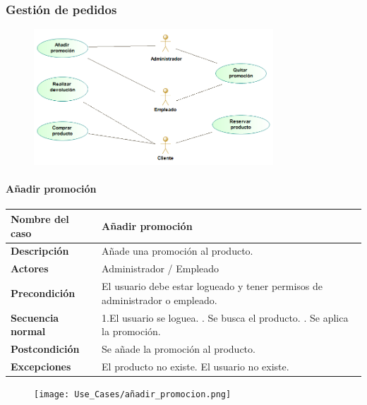 \subsubsection{Gestión de pedidos}

\begin{figure}[H]
	\centering
	\includegraphics[width=0.8\textwidth]{Use_Cases/gestion de pedidos.png}
\end{figure}
\newpage
\paragraph{Añadir promoción}
\begin{table}[H]
	\centering
	\small
	\begin{tabularx}{0.8\textwidth}{|p{3.5cm}|X|}
		\hline
		\rowcolor{lightgray}
		\textbf{Nombre del caso}  & \textbf{Añadir promoción}                                                    \\
		\hline
		\textbf{Descripción}      & Añade una promoción al producto.                                             \\
		\hline
		\textbf{Actores}          & Administrador /  Empleado                                                    \\
		\hline
		\textbf{Precondición}     & El usuario debe estar logueado y tener permisos de administrador o empleado. \\
		\hline
		\textbf{Secuencia normal} & 1.El usuario se loguea. \newline
		2. Se busca el producto. \newline
		3. Se aplica la promoción.                                                                               \\
		\hline
		\textbf{Postcondición}    & Se añade la promoción al producto.                                           \\
		\hline
		\textbf{Excepciones}      & El producto no existe.
		\newline El usuario no existe.                                                                           \\
		\hline
	\end{tabularx}
\end{table}
\begin{figure}[H]
	\centering
	\texttt{[image: Use\_Cases/añadir\_promocion.png]}
\end{figure}
\newpage
